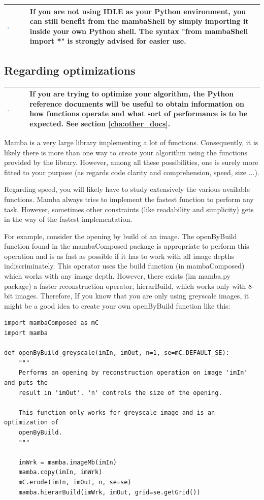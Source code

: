 \documentclass[a4paper,10pt,oneside]{article}
\newenvironment{tipBox}
{
    \begin{center}
    \begin{tabular}{ | b{0.1\textwidth} b{0.8\textwidth} | }
    \hline
    \rowcolor{lightblue}
    \includegraphics[width=0.1\textwidth]{Crystal_Clear_action_info.png} &
}
{
    \\
    \hline
    \end{tabular}
    \end{center}
}
\begin{document}
\begin{tipBox}
If you are not using IDLE as your Python environment, you can still benefit
from the mambaShell by simply importing it inside your own Python shell.
The syntax "from mambaShell import *" is strongly advised for easier use.
\end{tipBox}

\subsection{Regarding optimizations}

\begin{tipBox}
If you are trying to optimize your algorithm, the Python reference documents
will be useful to obtain information on how functions operate and what
sort of performance is to be expected. See section \ref{cha:other_docs}.
\end{tipBox}

Mamba is a very large library implementing a lot of functions. Consequently, it
is likely there is more than one way to create your algorithm using the functions
provided by the library. However, among all these possibilities, one is surely more
fitted to your purpose (as regards code clarity and comprehension, speed, size ...).

Regarding speed, you will likely have to study extensively the various
available functions. Mamba always tries to implement the fastest function to 
perform any task. However, sometimes other constraints (like readability and
simplicity) gets in the way of the fastest implementation.

For example, consider the opening by build of an image. The openByBuild function
found in the mambaComposed package is appropriate to perform this operation and
is as fast as possible if it has to work with all image depths indiscriminately.
This operator uses the build function (in mambaComposed) which works with any image
depth. However, there exists (im mamba.py package) a faster reconstruction operator,
hierarBuild, which works only with 8-bit images. Therefore, If you know that you are
only using greyscale images, it might be a good idea to create your own openByBuild
function like this:

\lstset{language=Python}
\begin{lstlisting}
import mambaComposed as mC
import mamba

def openByBuild_greyscale(imIn, imOut, n=1, se=mC.DEFAULT_SE):
    """
    Performs an opening by reconstruction operation on image 'imIn' and puts the
    result in 'imOut'. 'n' controls the size of the opening.
    
    This function only works for greyscale image and is an optimization of
    openByBuild.
    """
    
    imWrk = mamba.imageMb(imIn)
    mamba.copy(imIn, imWrk)
    mC.erode(imIn, imOut, n, se=se)
    mamba.hierarBuild(imWrk, imOut, grid=se.getGrid())
\end{lstlisting}
\end{document}
